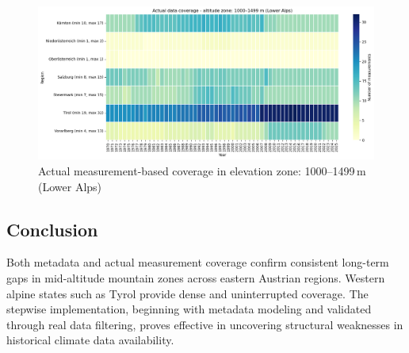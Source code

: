 \begin{figure}[htbp]
    \centering
    \includegraphics[width=\textwidth]{img/data_coverage_loweralps.png}
    \caption{Actual measurement-based coverage in elevation zone: 1000--1499\,m (Lower Alps)}
    \label{fig:coverage_real_loweralps}
\end{figure}

\subsection*{Conclusion}
Both metadata and actual measurement coverage confirm consistent long-term gaps in mid-altitude mountain zones across eastern Austrian regions. Western alpine states such as Tyrol provide dense and uninterrupted coverage. The stepwise implementation, beginning with metadata modeling and validated through real data filtering, proves effective in uncovering structural weaknesses in historical climate data availability.
